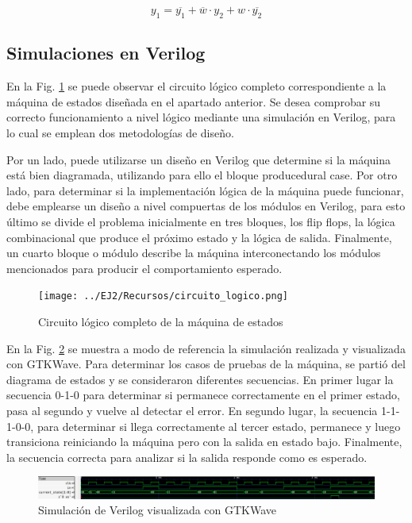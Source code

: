 \begin{equation}
    y_1 = \overline{y_1} + \overline{w} \cdot y_2 + w \cdot \overline{y_2}
\end{equation}

\subsection{Simulaciones en Verilog}
En la Fig. \ref{fig:circuito_logico_ej2} se puede observar el circuito l\'ogico completo correspondiente a la m\'aquina de estados dise\~nada
en el apartado anterior. Se desea comprobar su correcto funcionamiento a nivel l\'ogico mediante una simulaci\'on en Verilog, para lo cual se emplean
dos metodolog\'ias de dise\~no.

Por un lado, puede utilizarse un dise\~no en Verilog que determine si la m\'aquina est\'a bien diagramada, utilizando para ello el bloque producedural case.
Por otro lado, para determinar si la implementaci\'on l\'ogica de la m\'aquina puede funcionar, debe emplearse un dise\~no a nivel compuertas de los m\'odulos en Verilog,
para esto \'ultimo se divide el problema inicialmente en tres bloques, los flip flops, la l\'ogica combinacional que produce el pr\'oximo estado y la l\'ogica de salida. Finalmente,
un cuarto bloque o m\'odulo describe la m\'aquina interconectando los m\'odulos mencionados para producir el comportamiento esperado.

\begin{figure}[H]
    \centering
    \texttt{[image: ../EJ2/Recursos/circuito\_logico.png]}
    \caption{Circuito l\'ogico completo de la m\'aquina de estados}
    \label{fig:circuito_logico_ej2}
\end{figure}

En la Fig. \ref{fig:ej2_simulacion} se muestra a modo de referencia la simulaci\'on realizada y visualizada con GTKWave. Para determinar los casos de pruebas de la m\'aquina,
se parti\'o del diagrama de estados y se consideraron diferentes secuencias. En primer lugar la secuencia 0-1-0 para determinar si permanece correctamente en el primer estado,
pasa al segundo y vuelve al detectar el error. En segundo lugar, la secuencia 1-1-1-0-0, para determinar si llega correctamente al tercer estado, permanece y luego transiciona reiniciando
la m\'aquina pero con la salida en estado bajo. Finalmente, la secuencia correcta para analizar si la salida responde como es esperado.

\begin{figure}[H]
    \centering
    \includegraphics[scale=0.4]{../EJ2/Recursos/simulacion.png}    
    \caption{Simulaci\'on de Verilog visualizada con GTKWave}
    \label{fig:ej2_simulacion}
\end{figure}


